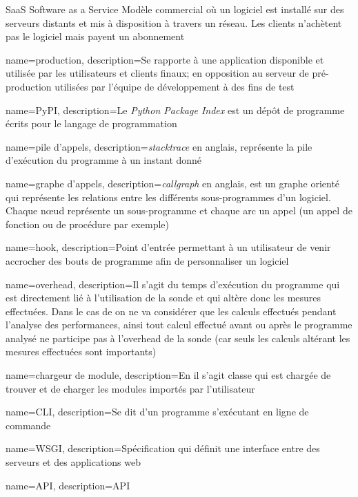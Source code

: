 \usepackage{xparse}
 {
}

  {SaaS}            %
  {Software as a Service}  %
  {Modèle commercial o\`u un logiciel est installé sur des serveurs distants et mis à disposition à travers un réseau. Les clients n'achètent pas le logiciel mais payent un abonnement} %

{
  name=production,
  description=Se rapporte à une application disponible et utilisée par les utilisateurs et clients finaux; en opposition au serveur de pré-production utilisées par l'équipe de développement à des fins de test
}
 
{
  name=PyPI,
  description=Le \emph{Python Package Index} est un dépôt de programme écrits pour le langage de programmation \Python
}
 
{
  name=pile d'appels,
  description={\emph{stacktrace} en anglais, représente la pile d'exécution du programme à un instant donné}
}
 
{
  name=graphe d'appels,
  description={\emph{callgraph} en anglais, est un graphe orienté qui représente les relations entre les différents sous-programmes d'un logiciel. Chaque nœud représente un sous-programme et chaque arc un appel (un appel de fonction ou de procédure par exemple)}
}
 
{
  name=hook,
  description=Point d'entrée permettant à un utilisateur de venir accrocher des bouts de programme afin de personnaliser un logiciel
}
 
{
  name=overhead,
  description={Il s'agit du temps d'exécution du programme qui est directement lié à l'utilisation de la sonde et qui altère donc les mesures effectuées. Dans le cas de \Blackfire on ne va considérer que les calculs effectués pendant l'analyse des performances, ainsi tout calcul effectué avant ou après le programme analysé ne participe pas à l'overhead de la sonde (car seuls les calculs altérant les mesures effectuées sont importants)}
}
 
{
  name=chargeur de module,
  description={En \Python il s'agit classe qui est chargée de trouver et de charger les modules importés par l'utilisateur}
}
 
{
  name=CLI,
  description=Se dit d'un programme s'exécutant en ligne de commande
}
 
{
  name=WSGI,
  description=Spécification qui définit une interface entre des serveurs et des applications web \Python
}
 
{
  name=API,
  description=API
}
